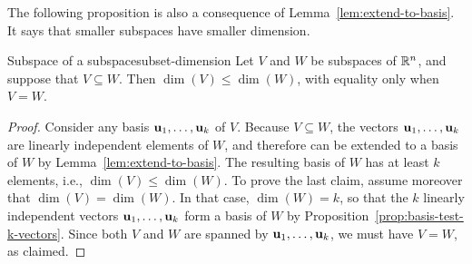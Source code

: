 The following proposition is also a consequence of
Lemma~\ref{lem:extend-to-basis}. It says that smaller subspaces have
smaller dimension.

\begin{proposition}{Subspace of a subspace}{subset-dimension}
  Let $V$ and $W$ be subspaces of\/ $\mathbb{R}^n$, and suppose that
  $V\subseteq W$.  Then $\dim(V)\leq\dim(W)$, with equality only when
  $V=W$.
\end{proposition}

\begin{proof}
  Consider any basis $\vect{u}_1,\ldots,\vect{u}_k$ of $V$. Because
  $V\subseteq W$, the vectors $\vect{u}_1,\ldots,\vect{u}_k$ are
  linearly independent elements of $W$, and therefore can be extended
  to a basis of $W$ by Lemma~\ref{lem:extend-to-basis}. The resulting
  basis of $W$ has at least $k$ elements, i.e., $\dim(V)\leq\dim(W)$.
  To prove the last claim, assume moreover that $\dim(V)=\dim(W)$. In
  that case, $\dim(W)=k$, so that the $k$ linearly independent vectors
  $\vect{u}_1,\ldots,\vect{u}_k$ form a basis of $W$ by
  Proposition~\ref{prop:basis-test-k-vectors}. Since both $V$ and $W$
  are spanned by $\vect{u}_1,\ldots,\vect{u}_k$, we must have $V=W$,
  as claimed.
\end{proof}
